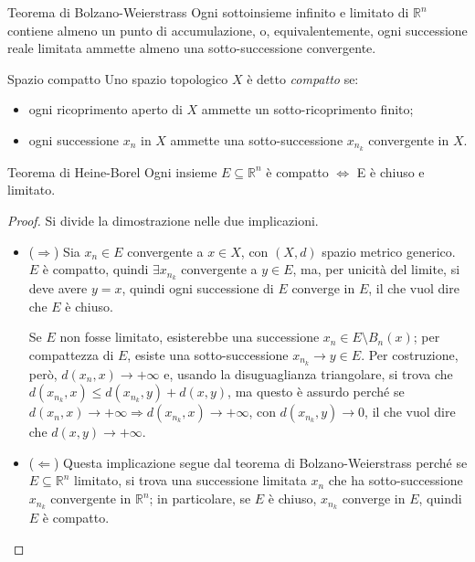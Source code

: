 \documentclass[11pt, a4paper]{scrartcl}
\theoremstyle{definition}
\numberwithin{esempio}{section}
\theoremstyle{definition}
\numberwithin{obs}{section}
\numberwithin{nota}{section}
\numberwithin{equation}{subsection}
\begin{document}
\begin{teorema}
	{Teorema di Bolzano-Weierstrass}{}
	Ogni sottoinsieme infinito e limitato di $\mathbb{R}^n$ contiene almeno un punto di accumulazione, o, equivalentemente, ogni successione reale limitata ammette almeno una sotto-successione convergente.
\end{teorema}
\begin{definizione}
	{Spazio compatto}{}
	Uno spazio topologico $X$ \`e detto \textit{compatto} se:
	\begin{itemize}
		\item ogni ricoprimento aperto di $X$ ammette un sotto-ricoprimento finito;
		\item ogni successione $x_n$ in $X$ ammette una sotto-successione $x_{n_k} $ convergente in $X$.
	\end{itemize}
\end{definizione}
\begin{teorema}
	{Teorema di Heine-Borel}{}
	Ogni insieme $E \subseteq \mathbb{R}^n$ \`e compatto $\iff$ E \`e chiuso e limitato.
	\begin{proof}
		Si divide la dimostrazione nelle due implicazioni.
\begin{itemize}
	\item ($\Rightarrow $) Sia $x_n \in E$ convergente a $x \in X$, con $(X,d)$ spazio metrico generico.
		$E$ \`e compatto, quindi $\exists x_{n_k} $ convergente a $y \in E$, ma, per unicit\`a del limite, si deve avere $y= x$, quindi ogni successione di $E$ converge in $E$, il che vuol dire che $E$ \`e chiuso.

		Se $E$ non fosse limitato, esisterebbe una successione $x_n \in  E \setminus B_n(x)$; per compattezza di $E$, esiste una sotto-successione $x_{n_k} \to y \in E$.
		Per costruzione, per\`o, $d(x_n,x) \to +\infty $ e, usando la disuguaglianza triangolare, si trova che $d(x_{n_k} ,x) \le d(x_{n_k} ,y) + d(x,y)$, ma questo \`e assurdo perch\'e se $d(x_n,x) \to +\infty \Rightarrow d(x_{n_k} ,x)\to +\infty$, con $d(x_{n_k} ,y) \to 0$, il che vuol dire che $d(x,y) \to +\infty$.
	\item ($\Leftarrow$) Questa implicazione segue dal teorema di Bolzano-Weierstrass perch\'e se $E \subseteq \mathbb{R}^n$ limitato, si trova una successione limitata $x_n$ che ha sotto-successione $x_{n_k} $ convergente in $\mathbb{R}^n$; in particolare, se $E$ \`e chiuso, $x_{n_k} $ converge in $E$, quindi $E$ \`e compatto.
\end{itemize}
	\end{proof}
\end{teorema}
\end{document}
